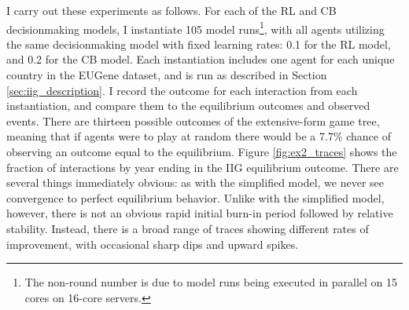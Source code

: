 I carry out these experiments as follows. For each of the RL and CB decisionmaking models, I instantiate 105 model runs\footnote{The non-round number is due to model runs being executed in parallel on 15 cores on 16-core servers.}, with all agents utilizing the same decisionmaking model with fixed learning rates: 0.1 for the RL model, and 0.2 for the CB model. Each instantiation includes one agent for each unique country in the EUGene dataset, and is run as described in Section \ref{sec:iig_description}. I record the outcome for each interaction from each instantiation, and compare them to the equilibrium outcomes and observed events. There are thirteen possible outcomes of the extensive-form game tree, meaning that if agents were to play at random there would be a 7.7\% chance of observing an outcome equal to the equilibrium. Figure \ref{fig:ex2_traces} shows the fraction of interactions by year ending in the IIG equilibrium outcome. There are several things immediately obvious: as with the simplified model, we never see convergence to perfect equilibrium behavior. Unlike with the simplified model, however, there is not an obvious rapid initial burn-in period followed by relative stability. Instead, there is a broad range of traces showing different rates of improvement, with occasional sharp dips and upward spikes. 

